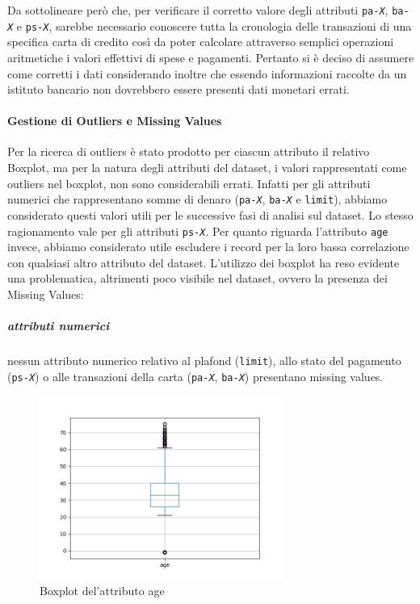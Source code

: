 Da sottolineare per\`o che, per verificare il corretto
valore degli attributi  \texttt{pa-\textit{X}},
\texttt{ba-\textit{X}} e \texttt{ps-\textit{X}}, sarebbe
necessario conoscere tutta la cronologia delle transazioni
di una specifica carta di credito cos\`i da poter calcolare
attraverso semplici operazioni aritmetiche i valori effettivi
di spese e pagamenti. Pertanto si \`e deciso di assumere come
corretti i dati considerando inoltre che essendo informazioni
raccolte da un istituto bancario non dovrebbero essere presenti
dati monetari errati. 

\paragraph{Gestione di Outliers e Missing Values}
Per la ricerca di outliers \`e stato prodotto per ciascun
attributo il relativo Boxplot, ma per la natura degli attributi
del dataset, i valori rappresentati come outliers nel boxplot,
non sono considerabili errati. Infatti per gli attributi numerici
che rappresentano somme di denaro (\texttt{pa-\textit{X}},
\texttt{ba-\textit{X}} e \texttt{limit}), abbiamo considerato
questi valori utili per le successive fasi di analisi sul
dataset. Lo stesso ragionamento vale per gli attributi 
\texttt{ps-\textit{X}}. Per quanto riguarda l'attributo
\texttt{age} invece, abbiamo considerato utile escludere i record
per la loro bassa correlazione con qualsiasi altro attributo
del dataset. L'utilizzo dei boxplot ha reso evidente una problematica, altrimenti poco visibile nel dataset, ovvero la presenza
dei Missing Values:

\subparagraph{attributi numerici}
 nessun attributo numerico relativo al plafond (\texttt{limit}), allo stato del pagamento (\texttt{ps-\textit{X}}) o alle transazioni della carta (\texttt{pa-\textit{X}}, \texttt{ba-\textit{X}}) presentano missing values.
 
\begin{figure}
\centering
\includegraphics[width=8cm]{img/age-boxplot.png}
\caption{Boxplot del'attributo age}
\end{figure}

